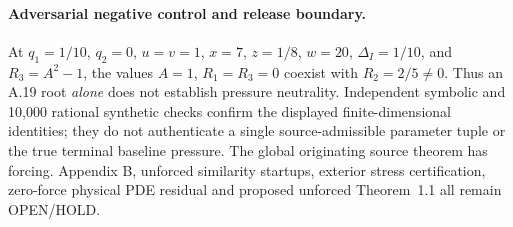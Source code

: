 \paragraph{Adversarial negative control and release boundary.}
At $q_1=1/10$, $q_2=0$, $u=v=1$, $x=7$, $z=1/8$,
$w=20$, $\Delta_I=1/10$, and $R_3=A^2-1$, the
values $A=1$, $R_1=R_3=0$ coexist with $R_2=2/5\ne0$.
Thus an A.19 root \emph{alone} does not establish
pressure neutrality. Independent symbolic and 10,000 rational
synthetic checks confirm the displayed finite-dimensional
identities; they do not authenticate a single source-admissible
parameter tuple or the true terminal baseline pressure.
The global originating source theorem has forcing.
Appendix B, unforced similarity startups, exterior stress
certification, zero-force physical PDE residual and proposed
unforced Theorem~1.1 all remain OPEN/HOLD.
